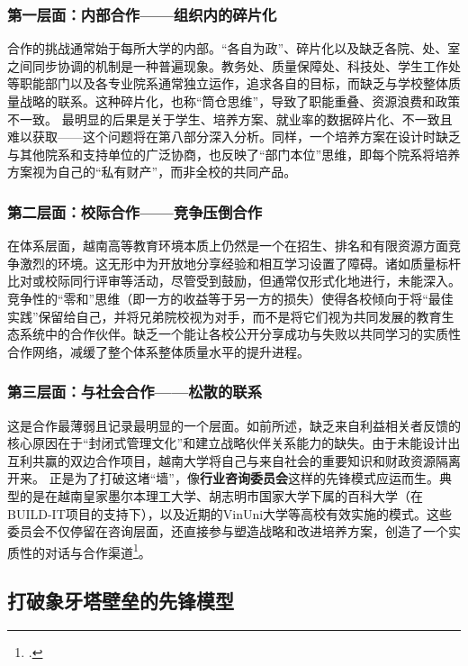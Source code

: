\subsubsection{第一层面：内部合作——组织内的碎片化}
合作的挑战通常始于每所大学的内部。“各自为政”、碎片化以及缺乏各院、处、室之间同步协调的机制是一种普遍现象。教务处、质量保障处、科技处、学生工作处等职能部门以及各专业院系通常独立运作，追求各自的目标，而缺乏与学校整体质量战略的联系。这种碎片化，也称“筒仓思维”，导致了职能重叠、资源浪费和政策不一致。
最明显的后果是关于学生、培养方案、就业率的数据碎片化、不一致且难以获取——这个问题将在第八部分深入分析。同样，一个培养方案在设计时缺乏与其他院系和支持单位的广泛协商，也反映了“部门本位”思维，即每个院系将培养方案视为自己的“私有财产”，而非全校的共同产品。

\subsubsection{第二层面：校际合作——竞争压倒合作}
在体系层面，越南高等教育环境本质上仍然是一个在招生、排名和有限资源方面竞争激烈的环境。这无形中为开放地分享经验和相互学习设置了障碍。诸如质量标杆比对或校际同行评审等活动，尽管受到鼓励，但通常仅形式化地进行，未能深入。
竞争性的“零和”思维（即一方的收益等于另一方的损失）使得各校倾向于将“最佳实践”保留给自己，并将兄弟院校视为对手，而不是将它们视为共同发展的教育生态系统中的合作伙伴。缺乏一个能让各校公开分享成功与失败以共同学习的实质性合作网络，减缓了整个体系整体质量水平的提升进程。

\subsubsection{第三层面：与社会合作——松散的联系}
这是合作最薄弱且记录最明显的一个层面。如前所述，缺乏来自利益相关者反馈的核心原因在于“封闭式管理文化”和建立战略伙伴关系能力的缺失。由于未能设计出互利共赢的双边合作项目，越南大学将自己与来自社会的重要知识和财政资源隔离开来。
正是为了打破这堵“墙”，像\textbf{行业咨询委员会}这样的先锋模式应运而生。典型的是在越南皇家墨尔本理工大学、胡志明市国家大学下属的百科大学（在BUILD-IT项目的支持下），以及近期的VinUni大学等高校有效实施的模式。这些委员会不仅停留在咨询层面，还直接参与塑造战略和改进培养方案，创造了一个实质性的对话与合作渠道\footcite{rmit_iab_2023}。



\subsection{打破象牙塔壁垒的先锋模型}
\label{subsec:mo_hinh_tien_phong}

